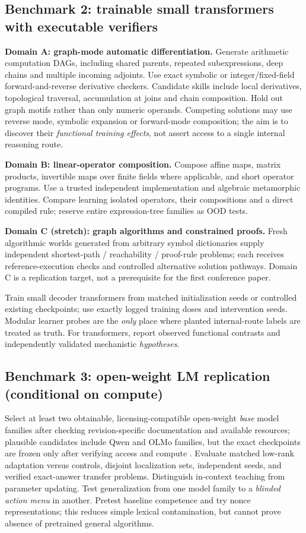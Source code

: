 \documentclass[11pt,a4paper]{article}
\theoremstyle{definition}\newtheorem{definition}[theorem]{Definition}
\theoremstyle{remark}\newtheorem{remark}[theorem]{Remark}
\begin{document}
\subsection{Benchmark 2: trainable small transformers with executable verifiers}
\textbf{Domain A: graph-mode automatic differentiation.} Generate arithmetic computation DAGs, including shared parents, repeated subexpressions, deep chains and multiple incoming adjoints. Use exact symbolic or integer/fixed-field forward-and-reverse derivative checkers. Candidate skills include local derivatives, topological traversal, accumulation at joins and chain composition. Hold out graph motifs rather than only numeric operands. Competing solutions may use reverse mode, symbolic expansion or forward-mode composition; the aim is to discover their \emph{functional training effects}, not assert access to a single internal reasoning route.

\textbf{Domain B: linear-operator composition.} Compose affine maps, matrix products, invertible maps over finite fields where applicable, and short operator programs. Use a trusted independent implementation and algebraic metamorphic identities. Compare learning isolated operators, their compositions and a direct compiled rule; reserve entire expression-tree families as OOD tests.

\textbf{Domain C (stretch): graph algorithms and constrained proofs.} Fresh algorithmic worlds generated from arbitrary symbol dictionaries supply independent shortest-path / reachability / proof-rule problems; each receives reference-execution checks and controlled alternative solution pathways. Domain C is a replication target, not a prerequisite for the first conference paper.

Train small decoder transformers from matched initialization seeds or controlled existing checkpoints; use exactly logged training doses and intervention seeds. Modular learner probes are the \emph{only} place where planted internal-route labels are treated as truth. For transformers, report observed functional contrasts and independently validated mechanistic \emph{hypotheses}.

\subsection{Benchmark 3: open-weight LM replication (conditional on compute)}
Select at least two obtainable, licensing-compatible open-weight \emph{base} model families after checking revision-specific documentation and available resources; plausible candidates include Qwen and OLMo families, but the exact checkpoints are frozen only after verifying access and compute \citep{qwen,olmo}. Evaluate matched low-rank adaptation versus controls, disjoint localization sets, independent seeds, and verified exact-answer transfer problems. Distinguish in-context teaching from parameter updating. Test generalization from one model family to a \emph{blinded action menu} in another. Pretest baseline competence and try nonce representations; this reduces simple lexical contamination, but cannot prove absence of pretrained general algorithms.
\end{document}
